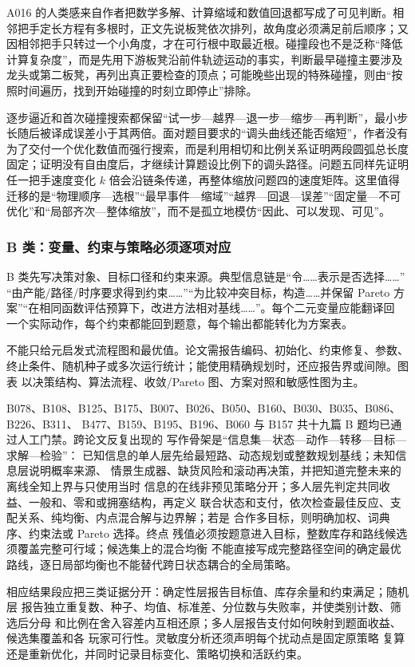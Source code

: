 \documentclass[UTF8,a4paper,12pt]{ctexart}
\begin{document}
A016 的人类感来自作者把数学多解、计算缩域和数值回退都写成了可见判断。相邻把手定长方程有多根时，正文先说板凳依次排列，故角度必须满足前后顺序；又因相邻把手只转过一个小角度，才在可行根中取最近根。碰撞段也不是泛称“降低计算复杂度”，而是先用下游板凳沿前件轨迹运动的事实，判断最早碰撞主要涉及龙头或第二板凳，再列出真正要检查的顶点；可能晚些出现的特殊碰撞，则由“按照时间遍历，找到开始碰撞的时刻立即停止”排除。

逐步逼近和首次碰撞搜索都保留“试一步—越界—退一步—缩步—再判断”，最小步长随后被译成误差小于其两倍。面对题目要求的“调头曲线还能否缩短”，作者没有为了交付一个优化数值而强行搜索，而是利用相切和比例关系证明两段圆弧总长度固定；证明没有自由度后，才继续计算题设比例下的调头路径。问题五同样先证明任一把手速度变化 $k$ 倍会沿链条传递，再整体缩放问题四的速度矩阵。这里值得迁移的是“物理顺序—选根”“最早事件—缩域”“越界—回退—误差”“固定量—不可优化”和“局部齐次—整体缩放”，而不是孤立地模仿“因此、可以发现、可见”。

\subsubsection{B 类：变量、约束与策略必须逐项对应}

B 类先写决策对象、目标口径和约束来源。典型信息链是“令……表示是否选择……”
“由产能/路径/时序要求得到约束……”“为比较冲突目标，构造……并保留 Pareto
方案”“在相同函数评估预算下，改进方法相对基线……”。每个二元变量应能翻译回
一个实际动作，每个约束都能回到题意，每个输出都能转化为方案表。

不能只给元启发式流程图和最优值。论文需报告编码、初始化、约束修复、参数、
终止条件、随机种子或多次运行统计；能使用精确规划时，还应报告界或间隙。图表
以决策结构、算法流程、收敛/Pareto 图、方案对照和敏感性图为主。

B078、B108、B125、B175、B007、B026、B050、B160、B030、B035、B086、B226、B311、
B477、B159、B195、B196、B060 与 B157 共十九篇 B 题均已通过人工门禁。跨论文反复出现的
写作骨架是“信息集—状态—动作—转移—目标—求解—检验”：
已知信息的单人层先给最短路、动态规划或整数规划基线；未知信息层说明概率来源、
情景生成器、缺货风险和滚动再决策，并把知道完整未来的离线全知上界与只使用当时
信息的在线非预见策略分开；多人层先判定共同收益、一般和、零和或拥塞结构，再定义
联合状态和支付，依次检查最佳反应、支配关系、纯均衡、内点混合解与边界解；若是
合作多目标，则明确加权、词典序、约束法或 Pareto 选择。终点
残值必须按题意进入目标，整数库存和路线候选须覆盖完整可行域；候选集上的混合均衡
不能直接写成完整路径空间的确定最优路线，逐日局部均衡也不能替代跨日状态耦合的全局策略。

相应结果段应把三类证据分开：确定性层报告目标值、库存余量和约束满足；随机层
报告独立重复数、种子、均值、标准差、分位数与失败率，并使类别计数、筛选后分母
和比例在舍入容差内互相还原；多人层报告支付如何映射到题面收益、候选集覆盖和各
玩家可行性。灵敏度分析还须声明每个扰动点是固定原策略
复算还是重新优化，并同时记录目标变化、策略切换和活跃约束。
\end{document}
